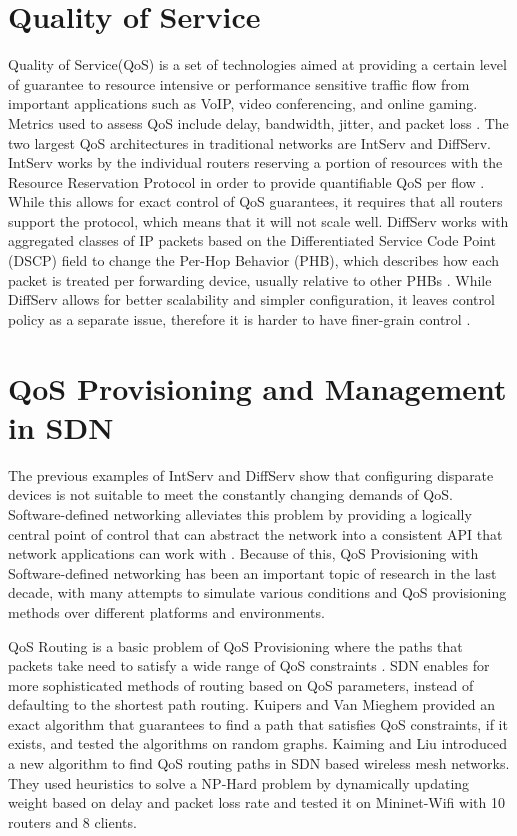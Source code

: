 \section{Quality of Service}
Quality of Service(QoS) is a set of technologies aimed at providing a certain level of guarantee to resource intensive or performance sensitive traffic flow from important applications such as VoIP, video conferencing, and online gaming. Metrics used to assess QoS include delay, bandwidth, jitter, and packet loss \cite{karakus_quality_2017}. The two largest QoS architectures in traditional networks are IntServ and DiffServ. IntServ works by the individual routers reserving a portion of resources with the Resource Reservation Protocol in order to provide quantifiable QoS per flow \cite{braden_rfc1633_1994}. While this allows for exact control of QoS guarantees, it requires that all routers support the protocol, which means that it will not scale well. DiffServ works with aggregated classes of IP packets based on the Differentiated Service Code Point (DSCP) field to change the Per-Hop Behavior (PHB), which describes how each packet is treated per forwarding device, usually relative to other PHBs \cite{blake_rfc2475_1998}. While DiffServ allows for better scalability and simpler configuration, it leaves control policy as a separate issue, therefore it is harder to have finer-grain control \cite{zhao_internet_2000}.


\section{QoS Provisioning and Management in SDN}
The previous examples of IntServ and DiffServ show that configuring disparate devices is not suitable to meet the constantly changing demands of QoS. Software-defined networking alleviates this problem by providing a logically central point of control that can abstract the network into a consistent API that network applications can work with \cite{kreutz_software-defined_2015}. Because of this, QoS Provisioning with Software-defined networking has been an important topic of research in the last decade, with many attempts to simulate various conditions and QoS provisioning methods over different platforms and environments.

QoS Routing is a basic problem of QoS Provisioning where the paths that packets take need to satisfy a wide range of QoS constraints \cite{zheng_wang_quality--service_1996}. SDN enables for more sophisticated methods of routing based on QoS parameters, instead of defaulting to the shortest path routing. Kuipers and Van Mieghem \cite{goos_qos_2001} provided an exact algorithm that guarantees to find a path that satisfies QoS constraints, if it exists, and tested the algorithms on random graphs. Kaiming and Liu \cite{kaiming_liu_novel_2016} introduced a new algorithm to find QoS routing paths in SDN based wireless mesh networks. They used heuristics to solve a NP-Hard problem by dynamically updating weight based on delay and packet loss rate and tested it on Mininet-Wifi with 10 routers and 8 clients.

